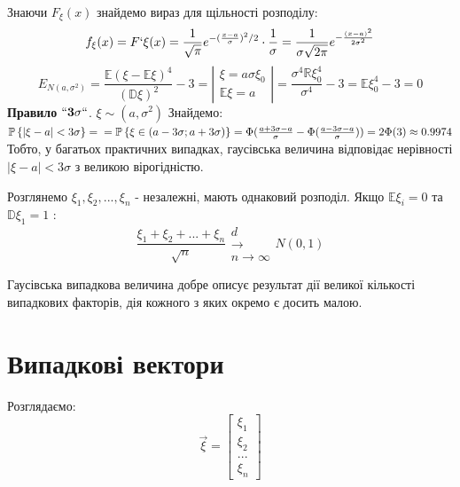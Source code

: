 \documentclass[14pt,a4paper]{scrartcl}
\theoremstyle{definition}
\theoremstyle{remark}
\theoremstyle{definition}
\theoremstyle{definition}
\begin{document}
Знаючи $ F_ \xi (x) $  знайдемо вираз для щільності розподілу:
$$
f_ \xi (x ) = F` \xi (x) =  \frac{1}{\sqrt{\pi}} e^{ - (\frac{x-a}{\sigma})^2/2 } \cdot \frac{1}{\sigma}  =  \frac{1}{\sigma \sqrt{2\pi}} e^ { - \frac{(x-a)^2}{2 \sigma^2} }
$$
$$
E_{N(a, \sigma^2)} =  \frac{ \mathbb{E} \left( \xi - \mathbb{E} \xi \right)^4 }{ \left( \mathbb{D} \xi \right)^2 }  -3
 =\left|
\begin{gathered}
 \xi = a \sigma \xi_0 \\
 \mathbb{E} \xi = a
\end{gathered}
 \right|
 = \frac{ \sigma ^4 \mathbb{R} \xi_0^4 }{ \sigma^4} - 3 = \mathbb{E} \xi_0^4 - 3 = 0
$$
\textbf{Правило } $ \mathbf{``3 \sigma``}$. \quad $ \xi \sim (a, \sigma^2)$ \quad Знайдемо:
$\mathbb{P} \left\lbrace  \left| \xi - a \right | < 3 \sigma  \right\rbrace
 = \\ = \mathbb{P} \left\lbrace  \xi \in (a - 3 \sigma; a + 3\sigma) \right\rbrace
= \Phi ( \frac{a + 3\sigma  -a  }{\sigma}  - \Phi( \frac{a - 3\sigma - a}{\sigma} )) = 2\Phi (3) \approx 0.9974
$\\
Тобто, у багатьох практичних випадках, гаусівська величина відповідає нерівності $\left| \xi - a \right | < 3 \sigma$ з великою вірогідністю.\\


\begin{boxteo}
Розглянемо $\xi_1, \xi_2, ... , \xi_n$ - незалежні, мають однаковий розподіл.
Якщо $\mathbb{E} \xi_i = 0 $ та $\mathbb{D} \xi_1 = 1$ :
$$
\frac{\xi_1 + \xi_2 + ... + \xi_n}{\sqrt{n}} \begin{gathered}
 d\\ \longrightarrow \\
 n \to \infty
\end{gathered}  N (0,1)
$$
\end{boxteo}
Гаусівська випадкова величина добре описує результат дії великої кількості випадкових факторів, дія кожного з яких окремо є досить малою.

\section{Випадкові вектори}
Розглядаємо: $$ \vec{ \xi} = \begin{bmatrix}
 \xi_1 \\
 \xi_2\\
 ...\\
 \xi_n
\end{bmatrix}$$
\end{document}
